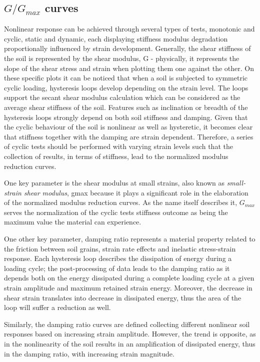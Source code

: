 \documentclass[11pt,a4paper]{report}
\begin{document}
\subsection{${G/G_{max}}$ curves}
Nonlinear response can be achieved through several types of tests, monotonic and cyclic, static and dynamic, each displaying stiffness modulus degradation proportionally influenced by strain development. Generally, the shear stiffness of the soil is represented by the shear modulus, G - physically, it represents the slope of the shear stress and strain when plotting them one against the other. On these specific plots it can be noticed that when a soil is subjected to symmetric cyclic loading, hysteresis loops develop depending on the strain level. The loops support the secant shear modulus calculation which can be considered as the average shear stiffness of the soil. Features such as inclination or breadth of the hysteresis loops strongly depend on both soil stiffness and damping. Given that the cyclic behaviour of the soil is nonlinear as well as hysteretic, it becomes clear that stiffness together with the damping are strain dependent. Therefore, a series of cyclic tests should be performed with varying strain levels such that the collection of results, in terms of stiffness, lead to the normalized modulus reduction curves.

One key parameter is the shear modulus at small strains, also known as \textit{small-strain shear modulus}, \gls{gmax} because it plays a significant role in the elaboration of the normalized modulus reduction curves. As the name itself describes it, $G_{max}$ serves the normalization of the cyclic tests stiffness outcome as being the maximum value the material can experience. 

One other key parameter, damping ratio represents a material property related to the friction between soil grains, strain rate effects and inelastic stress-strain response. Each hysteresis loop describes the dissipation of energy during a loading cycle; the post-processing of data leads to the damping ratio as it depends both on the energy dissipated during a complete loading cycle at a given strain amplitude and maximum retained strain energy. Moreover, the decrease in shear strain translates into decrease in dissipated energy, thus the area of the loop will suffer a reduction as well. 

Similarly, the damping ratio curves are defined collecting different nonlinear soil responses based on increasing strain amplitude. However, the trend is opposite, as in the nonlinearity of the soil results in an amplification of dissipated energy, thus in the damping ratio,  with increasing strain magnitude. 
\end{document}
